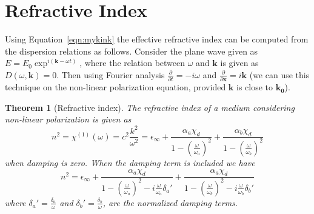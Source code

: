 \documentclass{article}[12pt]
\theoremstyle{plain}
\newtheorem{thm}{Theorem}
\begin{document}
\section{Refractive Index}
\label{sec:refractive-index}
Using Equation~\ref{eqn:mykink} the effective refractive index can be computed from the dispersion relations as follows.
Consider the plane wave given as $E=E_0\exp^{i(\mathbf{k}-\omega t)}$, where the relation between $\omega$ and $\mathbf{k}$ is
given as $D(\omega,\mathbf{k})=0$. Then using Fourier analysis $\frac{\partial}{\partial t}=-i\omega$ and
$\frac{\partial}{\partial \mathbf{x}}=i\mathbf{k}$ (we can use this technique on the non-linear polarization
equation, provided $\mathbf{k}$ is close to $\mathbf{k_0}$).
\begin{thm}[Refractive index]
The refractive index of a medium considering non-linear polarization is given as
\begin{equation}
n^2 = \chi^{(1)}(\omega) = c^2\frac{k^2}{\omega^2} = \epsilon_\infty + \frac{\alpha_a \chi_d}{1-(\frac{\omega}{\omega_a})^2} + \frac{\alpha_b \chi_d}{1-(\frac{\omega}{\omega_b})^2} \label{eqn:refindex1}
\end{equation}
when damping is zero. When the damping term is included we have
\begin{equation}
n^2 = \epsilon_\infty + \frac{\alpha_a \chi_d}{1-(\frac{\omega}{\omega_a})^2-i\frac{\omega}{\omega_a}\delta_a'} 
+ \frac{\alpha_a \chi_d}{1-(\frac{\omega}{\omega_b})^2-i\frac{\omega}{\omega_b}\delta_b'} 
\end{equation}
where $\delta_a'=\frac{\delta_a}{\omega}$ and $\delta_b'=\frac{\delta_b}{\omega}$, are the normalized damping terms.
\end{thm}
\end{document}
